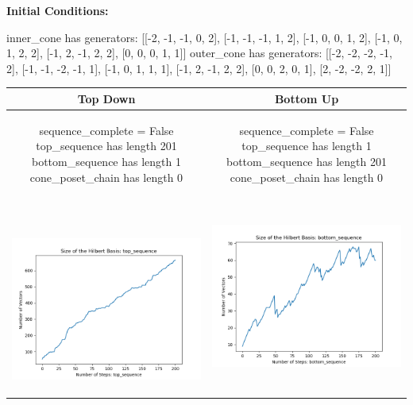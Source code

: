 \documentclass[10pt]{article}
\begin{document}
\textbf{Initial Conditions:}
\begin{SAGE}
inner_cone has generators: 
[[-2, -1, -1, 0, 2], [-1, -1, -1, 1, 2], [-1, 0, 0, 1, 2], [-1, 0, 1, 2, 2], [-1, 2, -1, 2, 2], [0, 0, 0, 1, 1]]
outer_cone has generators: 
[[-2, -2, -2, -1, 2], [-1, -1, -2, -1, 1], [-1, 0, 1, 1, 1], [-1, 2, -1, 2, 2], [0, 0, 2, 0, 1], [2, -2, -2, 2, 1]]

\end{SAGE}
\begin{tabular}{c|c}
\textbf{Top Down} & \textbf{Bottom Up} \\ \hline  
\begin{SAGE}
	sequence_complete = False
	top_sequence has length 201
	bottom_sequence has length 1
	cone_poset_chain has length 0
\end{SAGE} 
&
\begin{SAGE}
	sequence_complete = False
	top_sequence has length 1
	bottom_sequence has length 201
	cone_poset_chain has length 0
\end{SAGE} 
\\ \hline
\
\begin{minipage}{.45\textwidth}
\includegraphics[width=\textwidth]{"DATA/5d/6 generators 2 bound C/top_sequence SIZE"}
\end{minipage} &
\begin{minipage}{.45\textwidth}
\includegraphics[width=\textwidth]{"DATA/5d/6 generators 2 bound C bottomup/bottom_sequence SIZE"}

\end{minipage}
\end{tabular}
\end{document}
